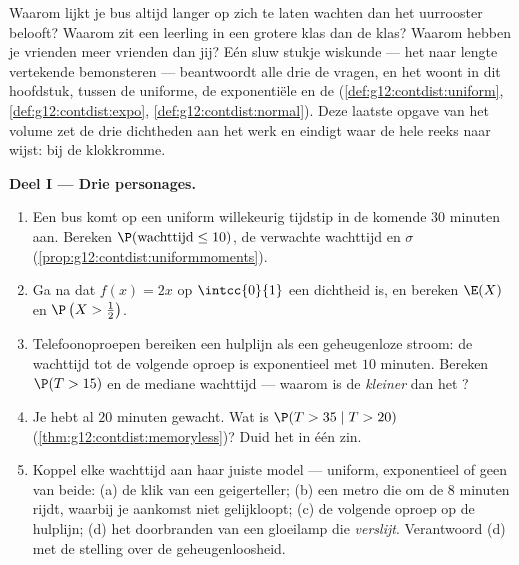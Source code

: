 \begin{problem}
\label{pb:g12:contdist:1}
Waarom lijkt je bus altijd langer op zich te laten wachten dan het uurrooster
belooft? Waarom zit een  leerling in een grotere klas dan de
 klas? Waarom hebben je vrienden meer vrienden dan jij? Eén sluw
stukje wiskunde --- het naar lengte vertekende bemonsteren --- beantwoordt alle
drie de vragen, en het woont in dit hoofdstuk, tussen de uniforme, de
exponentiële en de  (\cref{def:g12:contdist:uniform},
\cref{def:g12:contdist:expo}, \cref{def:g12:contdist:normal}). Deze laatste
opgave van het volume zet de drie dichtheden aan het werk en eindigt waar de
hele reeks naar wijst: bij de klokkromme.

\medskip
\noindent\textbf{Deel I --- Drie personages.}
\begin{enumerate}
  \item Een bus komt op een uniform willekeurig tijdstip in de komende $30$
        minuten aan. Bereken $\P(\text{wachttijd} \leq 10)$, de verwachte
        wachttijd en $\sigma$ (\cref{prop:g12:contdist:uniformmoments}).
  \item Ga na dat $f(x) = 2x$ op $\intcc{0}{1}$ een dichtheid is, en bereken
        $\E(X)$ en $\P\left(X > \frac12\right)$.
  \item Telefoonoproepen bereiken een hulplijn als een geheugenloze stroom: de
        wachttijd tot de volgende oproep is exponentieel met  $10$
        minuten. Bereken $\P(T > 15)$ en de mediane wachttijd --- waarom is de
         \emph{kleiner} dan het ?
  \item Je hebt al $20$ minuten gewacht. Wat is $\P(T > 35 \mid T > 20)$
        (\cref{thm:g12:contdist:memoryless})? Duid het in één zin.
  \item Koppel elke wachttijd aan haar juiste model --- uniform, exponentieel
        of geen van beide: (a) de klik van een geigerteller; (b) een metro die
        om de $8$ minuten rijdt, waarbij je aankomst niet gelijkloopt; (c) de
        volgende oproep op de hulplijn; (d) het doorbranden van een gloeilamp
        die \emph{verslijt}. Verantwoord (d) met de stelling over de
        geheugenloosheid.
\end{enumerate}


\end{problem}

